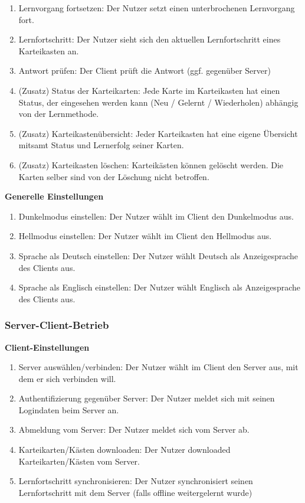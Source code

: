 \documentclass[fontsize=12pt,paper=a4,twoside]{scrartcl}
\begin{document}
\begin{enumerate}[resume, label={N\arabic*}]
	\item Lernvorgang fortsetzen: Der Nutzer setzt einen unterbrochenen Lernvorgang fort.
	\item Lernfortschritt: Der Nutzer sieht sich den aktuellen Lernfortschritt eines Karteikasten an.
	\item Antwort prüfen: Der Client prüft die Antwort (ggf. gegenüber Server)
	\item (Zusatz) Status der Karteikarten: Jede Karte im Karteikasten hat einen Status, der eingesehen werden kann (Neu / Gelernt / Wiederholen) abhängig von der Lernmethode.
	\item (Zusatz) Karteikastenübersicht: Jeder Karteikasten hat eine eigene Übersicht mitsamt Status und Lernerfolg seiner Karten.
	\item (Zusatz) Karteikasten löschen: Karteikästen können gelöscht werden. Die Karten selber sind von der Löschung nicht betroffen.
\end{enumerate}
\textbf{Generelle Einstellungen}
\begin{enumerate}[resume, label={N\arabic*}]
	\item Dunkelmodus einstellen: Der Nutzer wählt im Client den Dunkelmodus aus.
	\item Hellmodus einstellen: Der Nutzer wählt im Client den Hellmodus aus.
	\item Sprache als Deutsch einstellen: Der Nutzer wählt Deutsch als Anzeigesprache des Clients aus.
	\item Sprache als Englisch einstellen: Der Nutzer wählt Englisch als Anzeigesprache des Clients aus.
\end{enumerate}

\subsubsection{Server-Client-Betrieb}
\textbf{Client-Einstellungen}
\begin{enumerate}[resume, label={N\arabic*}]
	\item Server auswählen/verbinden: Der Nutzer wählt im Client den Server aus, mit dem er sich verbinden will.
	\item Authentifizierung gegenüber Server: Der Nutzer meldet sich mit seinen Logindaten beim Server an.
	\item Abmeldung vom Server: Der Nutzer meldet sich vom Server ab.
	\item Karteikarten/Kästen downloaden: Der Nutzer downloaded Karteikarten/Kästen vom Server.
	\item Lernfortschritt synchronisieren: Der Nutzer synchronisiert seinen Lernfortschritt mit dem Server (falls offline weitergelernt wurde)
\end{enumerate}
\end{document}
